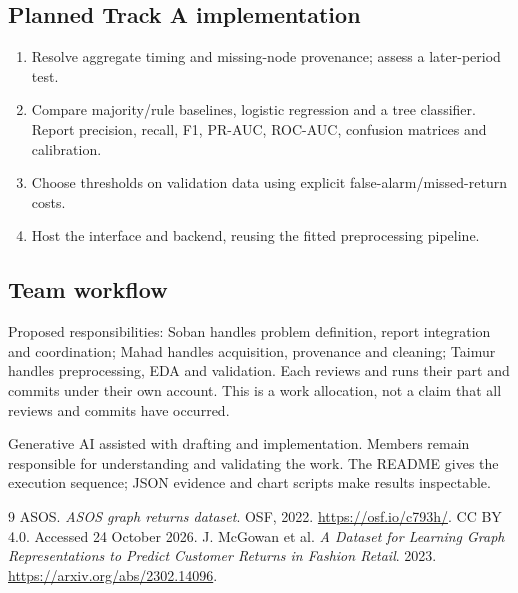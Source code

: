 \documentclass[11pt,a4paper]{article}
\begin{document}
\subsection*{Planned Track A implementation}
\begin{enumerate}
\item Resolve aggregate timing and missing-node provenance; assess a later-period test.
\item Compare majority/rule baselines, logistic regression and a tree classifier. Report precision, recall, F1, PR-AUC, ROC-AUC, confusion matrices and calibration.
\item Choose thresholds on validation data using explicit false-alarm/missed-return costs.
\item Host the interface and backend, reusing the fitted preprocessing pipeline.
\end{enumerate}
\subsection*{Team workflow}
Proposed responsibilities: Soban handles problem definition, report integration and coordination; Mahad handles acquisition, provenance and cleaning; Taimur handles preprocessing, EDA and validation. Each reviews and runs their part and commits under their own account. This is a work allocation, not a claim that all reviews and commits have occurred.

Generative AI assisted with drafting and implementation. Members remain responsible for understanding and validating the work. The README gives the execution sequence; JSON evidence and chart scripts make results inspectable.
\small
\begin{thebibliography}{9}
 ASOS. \emph{ASOS graph returns dataset}. OSF, 2022. \url{https://osf.io/c793h/}. CC BY 4.0. Accessed 24 October 2026.
 J. McGowan et al. \emph{A Dataset for Learning Graph Representations to Predict Customer Returns in Fashion Retail}. 2023. \url{https://arxiv.org/abs/2302.14096}.
\end{thebibliography}
\end{document}

